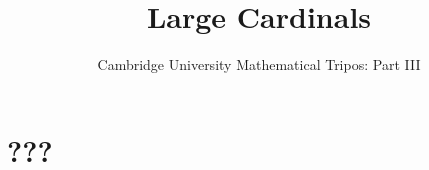 \documentclass{article}
\title{Large Cardinals}
\author{Cambridge University Mathematical Tripos: Part III}
\begin{document}
\maketitle

\tableofcontentsnewpage{}

\section{???}

\end{document}
